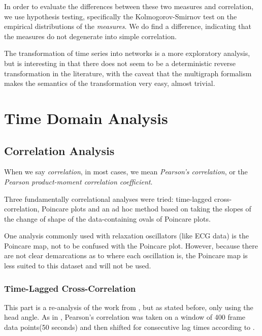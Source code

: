 \documentclass[12pt]{article}
\begin{document}
In order to evaluate the differences between these two measures and correlation, we use hypothesis testing, specifically the Kolmogorov-Smirnov test on the empirical distributions of the \emph{measures}. We do find a difference, indicating that the measures do not degenerate into simple correlation.%

The transformation of time series into networks is a more exploratory analysis, but is interesting in that there does not seem to be a deterministic reverse transformation in the literature, with the caveat that the multigraph formalism makes the semantics of the transformation very easy, almost trivial.

\section{Time Domain Analysis}

\subsection{Correlation Analysis}

When we say \emph{correlation}, in most cases, we mean \emph{Pearson's correlation}, or the \emph{Pearson product-moment correlation coefficient}.

Three fundamentally correlational analyses were tried: time-lagged cross-correlation, Poincare plots and an ad hoc method based on taking the slopes of the change of shape of the data-containing ovals of Poincare plots.

One analysis commonly used with relaxation oscillators (like ECG data) is the Poincare map, not to be confused with the Poincare plot. However, because there are not clear demarcations as to where each oscillation is, the Poincare map is less suited to this dataset and will not be used\cite{physsync}.

\subsubsection{Time-Lagged Cross-Correlation}

This part is a re-analysis of the work from \cite{andrea}, but as stated before, only using the head angle. As in \cite{andrea}, Pearson's correlation was taken on a window of 400 frame data points(50 seconds) and then shifted for consecutive lag times according to \cite{framedifferencing}.
\end{document}
